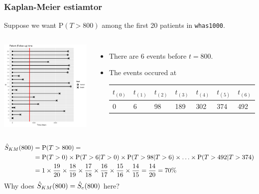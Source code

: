 \documentclass[10pt]{beamer}\usepackage[]{graphicx}\usepackage[]{color}
\newcommand{\p}{\mathrm{P}}
\newcommand{\Skm}{\hat{S}_{\scriptsize{KM}}}
\begin{document}
\begin{frame}
  \frametitle{Kaplan-Meier estiamtor}
  Suppose we want $\p(T > 800)$ among the first 20 patients in \texttt{whas1000}.
  \begin{columns}
    \includegraphics[scale = .3]{tab1-1-4}
    \begin{itemize}
    \item There are 6 events before $t = 800$.
    \item The events occured at 
      {\scriptsize
      \begin{tabular}{lllllll}
        $t_{(0)}$ & $t_{(1)}$ & $t_{(2)}$ & $t_{(3)}$ & $t_{(4)}$ & $t_{(5)}$ & $t_{(6)}$ \\
        \midrule
        0 & 6 & 98 & 189 & 302 & 374 & 492 \\
      \end{tabular}}
    \end{itemize}
  \end{columns}
  \vspace{-.3cm}
  {\scriptsize
  \begin{align*}
    \Skm(800) &= \p(T > 800) =\\
    &= \p(T > 0) \times \p(T > 6|T > 0) \times \p(T > 98|T > 6) \times
    \ldots\times \p(T > 492|T > 374) \\
    &=1 \times \frac{19}{20} \times \frac{18}{19} \times \frac{17}{18} \times \frac{16}{17} \times \frac{15}{16} \times 
    \frac{14}{15} = \frac{14}{20} = 70\%
  \end{align*}
  }
  Why does $\Skm(800) = \hat S_e(800)$ here?
\end{frame}
\end{document}
